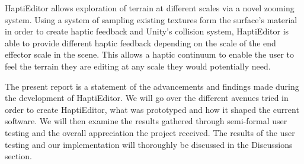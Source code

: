 HaptiEditor allows exploration of terrain at different scales via a novel zooming system.
Using a system of sampling existing textures form the surface's material in order to create haptic feedback and Unity's collision system, HaptiEditor is able to provide different haptic feedback depending on the scale of the end effector scale in the scene.
This allows a haptic continuum to enable the user to feel the terrain they are editing at any scale they would potentially need.

The present report is a statement of the advancements and findings made during the development of HaptiEditor. 
We will go over the different avenues tried in order to create HaptiEditor, what was prototyped and how it shaped the current software. 
We will then examine the results gathered through semi-formal user testing and the overall appreciation the project received. 
The results of the user testing and our implementation will thoroughly be discussed in the Discussions section.
